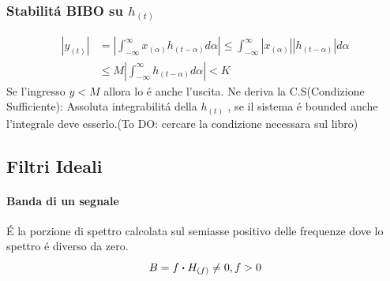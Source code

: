         \subsubsection{Stabilitá BIBO su $h_{(t)}$}
            \begin{align}
                |y_{(t)}| &= \left|\int_{-\infty}^{\infty}x_{(\alpha)}h_{(t-\alpha)} d\alpha \right|\leq \int_{-\infty}^{\infty}|x_{(\alpha)}||h_{(t-\alpha)}| d\alpha \nonumber \\
                          &\leq M\left|\int_{-\infty}^{\infty}h_{(t-\alpha)} d\alpha \right| <K\nonumber
            \end{align}
            Se l'ingresso $y<M$ allora lo é anche l'uscita. Ne deriva la C.S(Condizione Sufficiente): Assoluta integrabilitá della $h_{(t)}$ ,
            se il sistema é bounded anche l'integrale deve esserlo.(To DO: cercare la condizione necessara sul libro)
    \subsection{Filtri Ideali}
        \paragraph{Banda di un segnale} É la porzione di spettro calcolata sul semiasse positivo delle
        frequenze dove lo spettro é diverso da zero.
        \[
            B = {f\dotproduct H_{(f)} \neq 0, f >0}  
        \]
